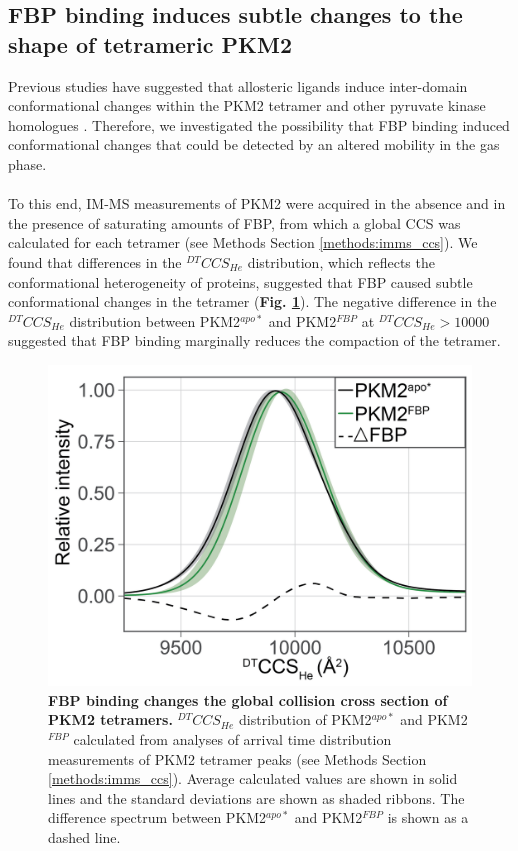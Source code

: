 \subsection{FBP binding induces subtle changes to the shape of tetrameric PKM2}
\label{subsec:fbp_ccsd}
Previous studies have suggested that allosteric ligands induce inter-domain conformational changes within the PKM2 tetramer \cite{Dombrauckas:2005aa,Gehrig:2017aa,Morgan:2013aa,Yan:2016aa} and other pyruvate kinase homologues \cite{Donovan:2016aa,Morgan:2010aa,Naithani:2015aa,Zhong:2017aa}. Therefore, we investigated the possibility that FBP binding induced conformational changes that could be detected by an altered mobility in the gas phase.
%
%
\\\\
%
%
To this end, IM-MS measurements of PKM2 were acquired in the absence and in the presence of saturating amounts of FBP, from which a global CCS was calculated for each tetramer (see Methods Section \ref{methods:imms_ccs}). We found that differences in the $^{DT}CCS_{He}$ distribution, which reflects the conformational heterogeneity of proteins, suggested that FBP caused subtle conformational changes in the tetramer (\textbf{Fig. \ref{fig:pkm2_fbp_ccsd}}). The negative difference in the $^{DT}CCS_{He}$ distribution between PKM2$^{apo \ast}$ and PKM2$^{FBP}$ at $^{DT}CCS_{He} > 10000$ suggested that FBP binding marginally reduces the compaction of the tetramer.
%
%
%
%
%
\begin{figure}[!ht]
\includegraphics[scale=0.6]{ch5_fig7_fbp_global_ccs.png}
\caption[FBP binding changes the global collision cross section of PKM2 tetramers.] {\textbf{FBP binding changes the global collision cross section of PKM2 tetramers.} $^{DT}CCS_{He}$ distribution of PKM2$^{apo \ast}$ and PKM2$^{FBP}$ calculated from analyses of arrival time distribution measurements of PKM2 tetramer peaks (see Methods Section \ref{methods:imms_ccs}). Average calculated values are shown in solid lines and the standard deviations are shown as shaded ribbons. The difference spectrum between PKM2$^{apo \ast}$ and PKM2$^{FBP}$ is shown as a dashed line.}
\label{fig:pkm2_fbp_ccsd}
\end{figure}

